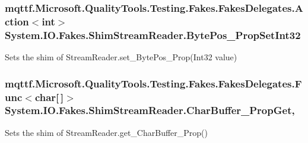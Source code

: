 \hypertarget{class_system_1_1_i_o_1_1_fakes_1_1_shim_stream_reader_a2d19237eb743e68c0abbdaf4b08c1e1a}{
\subsubsection[{Byte\-Pos\-\_\-\-Prop\-Set\-Int32}]{\setlength{\rightskip}{0pt plus 5cm}mqttf.\-Microsoft.\-Quality\-Tools.\-Testing.\-Fakes.\-Fakes\-Delegates.\-Action$<$int$>$ System.\-I\-O.\-Fakes.\-Shim\-Stream\-Reader.\-Byte\-Pos\-\_\-\-Prop\-Set\-Int32\hspace{0.3cm}{\ttfamily [set]}}}\label{class_system_1_1_i_o_1_1_fakes_1_1_shim_stream_reader_a2d19237eb743e68c0abbdaf4b08c1e1a}


Sets the shim of Stream\-Reader.\-set\-\_\-\-Byte\-Pos\-\_\-\-Prop(\-Int32 value)

\hypertarget{class_system_1_1_i_o_1_1_fakes_1_1_shim_stream_reader_a3953275952a84af867fcd0c9521e3612}{
\subsubsection[{Char\-Buffer\-\_\-\-Prop\-Get}]{\setlength{\rightskip}{0pt plus 5cm}mqttf.\-Microsoft.\-Quality\-Tools.\-Testing.\-Fakes.\-Fakes\-Delegates.\-Func$<$char\mbox{[}$\,$\mbox{]}$>$ System.\-I\-O.\-Fakes.\-Shim\-Stream\-Reader.\-Char\-Buffer\-\_\-\-Prop\-Get\hspace{0.3cm}{\ttfamily [get]}, {\ttfamily [set]}}}\label{class_system_1_1_i_o_1_1_fakes_1_1_shim_stream_reader_a3953275952a84af867fcd0c9521e3612}


Sets the shim of Stream\-Reader.\-get\-\_\-\-Char\-Buffer\-\_\-\-Prop()

